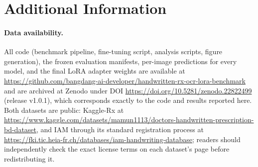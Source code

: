 \documentclass[12pt]{article}
\begin{document}
\section*{Additional Information}

\paragraph{Data availability.} All code (benchmark pipeline, fine-tuning script, analysis scripts, figure
generation), the frozen evaluation manifests, per-image predictions for every model, and the final LoRA
adapter weights are available at
\url{https://github.com/bangdang-ai-developer/handwritten-rx-ocr-lora-benchmark} and are archived at Zenodo
under DOI \url{https://doi.org/10.5281/zenodo.22822499} (release v1.0.1), which corresponds exactly to the
code and results reported here. Both datasets are public: Kaggle-Rx
at \url{https://www.kaggle.com/datasets/mamun1113/doctors-handwritten-prescription-bd-dataset}, and IAM
through its standard registration process at \url{https://fki.tic.heia-fr.ch/databases/iam-handwriting-database};
readers
should independently check the exact license terms on each dataset's page before redistributing it.
\end{document}
